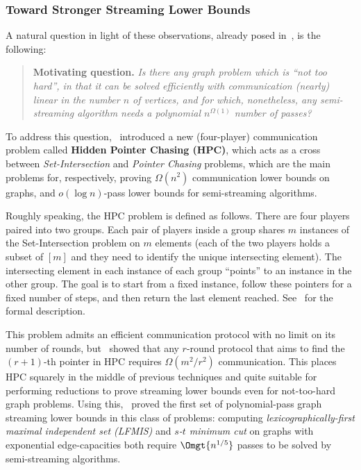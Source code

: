 \subsubsection*{Toward Stronger Streaming Lower Bounds} 
A natural question in light of these observations, already posed in~\cite{AssadiCK19}, is the following: 

\begin{quote}
\textbf{Motivating question.}
\textit{Is there any graph problem which is ``not too hard'', in that it can be solved efficiently with communication (nearly) linear in the number $n$ of vertices, and for which, nonetheless, any semi-streaming algorithm needs a polynomial $n^{\Omega(1)}$ number of passes?}
\end{quote}
To address this question,~\cite{AssadiCK19} introduced a new (four-player) communication problem called \textbf{Hidden Pointer Chasing (HPC)}, 
which acts as a cross between \emph{Set-Intersection} and \emph{Pointer Chasing} problems, which are the main problems for, respectively, proving $\Omega(n^2)$ communication lower bounds on graphs, and $o(\log{n})$-pass lower
bounds for semi-streaming algorithms. 

Roughly speaking, the HPC problem is defined as follows. There are four players paired into two groups. Each pair
of players inside a group shares $m$ instances of the Set-Intersection problem on $m$ elements (each of the two players holds a subset of $[m]$ and they need to identify the unique intersecting element). The
intersecting element in each instance of each group ``points'' to an instance in the other group. The
goal is to start from a fixed instance, follow these pointers for a fixed number of steps, and then return the last element reached. See~ for the formal description. 

This problem admits an efficient communication protocol with no limit on its number of rounds, but~\cite{AssadiCK19} showed that any $r$-round protocol
that aims to find the $(r+1)$-th pointer in HPC requires $\Omega(m^2/r^2)$ communication. This places HPC 
squarely in the middle of previous techniques and quite suitable for performing reductions to prove streaming lower bounds
even for not-too-hard graph problems. Using this,~\cite{AssadiCK19} proved the first set of polynomial-pass graph streaming lower bounds
in this class of problems: computing \emph{lexicographically-first maximal independent set (LFMIS)} and \emph{$s$-$t$ minimum cut} on graphs with exponential edge-capacities both require $\Omgt{n^{1/5}}$ passes to be solved by semi-streaming algorithms. 

